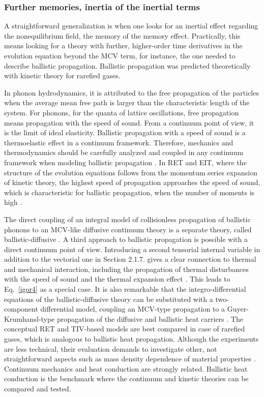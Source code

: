 \documentclass[sn-mathphys]{sn-jnl}%
\theoremstyle{thmstyleone}%
\theoremstyle{thmstyletwo}%
\theoremstyle{thmstylethree}%
\begin{document}
{%
\subsubsection{Further memories, inertia of the inertial terms}
A straightforward generalization is when one looks for an inertial effect regarding the nonequilibrium field, the memory of the memory effect. Practically, this means looking for a theory with further, higher-order time derivatives in the evolution equation beyond the MCV term, for instance, the one needed to describe ballistic propagation. Ballistic propagation was predicted theoretically with kinetic theory for rarefied gases.

In phonon hydrodynamics, it is attributed to the free propagation of the particles when the average mean free path is larger than the characteristic length of the system. For phonons, for the quanta of lattice oscillations, free propagation means propagation with the speed of sound. From a continuum point of view, it is the limit of ideal elasticity. Ballistic propagation with a speed of sound is a thermoelastic effect in a continuum framework. Therefore, mechanics and thermodynamics should be carefully analyzed and coupled in any continuum framework when modeling ballistic propagation \cite{FriCim95,FriCim96, FriCim98, BallEtal20}. In RET and EIT, where the structure of the evolution equations follows from the momentum series expansion of kinetic theory, the highest speed of propagation approaches the speed of sound, which is characteristic for ballistic propagation, when the number of moments is high \cite{MulRug98b,DreStr93a}.

The direct coupling of an integral model of collisionless propagation of ballistic phonons to an MCV-like diffusive continuum theory is a separate theory, called ballistic-diffusive \cite{Che01a,Che02a}. { A third approach to ballistic propagation is possible with a direct continuum point of view. Introducing a second tensorial internal variable in addition to the vectorial one in Section 2.1.7. \cite{KovVan15a} gives a clear connection to thermal and mechanical interaction, including the propagation of thermal disturbances with the speed of sound and the thermal expansion effect \cite{BerBer13a,BerEng13a,BerVan16a,BerVan17b,Ber19a}. This leads to Eq.~\eqref{igor4} as a special case.} It is also remarkable that the integro-differential equations of the ballistic-diffusive theory can be substituted with a two-component differential model, coupling an MCV-type propagation to a Guyer-Krumhansl-type propagation of the diffusive and ballistic heat carriers \cite{LebEta11a}. The conceptual RET and TIV-based models are best compared in case of rarefied gases, which is analogous to ballistic heat propagation. Although the experiments are less technical, their evaluation demands to investigate other, not straightforward aspects such as mass density dependence of material properties \cite{AriEtal12c,RugSug15b,AriEta20a,KovEta20a}. Continuum mechanics and heat conduction are strongly related. Ballistic heat conduction is the benchmark where the continuum and kinetic theories can be compared and tested.

}
\end{document}
